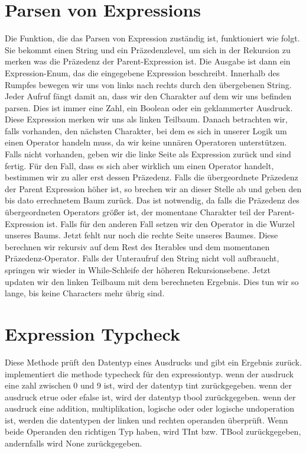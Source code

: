 \documentclass[a4paper, 1ppt]{article}
\begin{document}
\section{Parsen von Expressions}
Die Funktion, die das Parsen von Expression zuständig ist, funktioniert wie folgt.
Sie bekommt einen String und ein Präzedenzlevel, um sich in der Rekursion zu merken
was die Präzedenz der Parent-Expression ist. Die Ausgabe ist dann ein Expression-Enum, das die eingegebene Expression beschreibt.
Innerhalb des Rumpfes bewegen wir uns von links nach rechts durch den übergebenen String.
Jeder Aufruf fängt damit an, dass wir den Charakter auf dem wir uns befinden parsen.
Dies ist immer eine Zahl, ein Boolean oder ein geklammerter Ausdruck. 
Diese Expression merken wir uns als linken Teilbaum.
Danach betrachten wir, falls vorhanden, den nächsten Charakter, bei dem es sich in unserer Logik um einen Operator handeln muss, 
da wir keine unnären Operatoren unterstützen. Falls nicht vorhanden, geben wir die linke Seite als Expression zurück und sind fertig.
Für den Fall, dass es sich aber wirklich um einen Operator handelt, bestimmen wir zu aller erst dessen Präzedenz.
Falls die übergeordnete Präzedenz der Parent Expression höher ist, so brechen wir an dieser Stelle ab und geben den bis dato errechnetem Baum zurück.
Das ist notwendig, da falls die Präzedenz des übergeordneten Operators größer ist, der momentane Charakter teil der Parent-Expression ist.
Falls für den anderen Fall setzen wir den Operator in die Wurzel unseres Baums. 
Jetzt fehlt nur noch die rechte Seite unseres Baumes.
Diese berechnen wir rekursiv auf dem Rest des Iterables und dem momentanen Präzedenz-Operator.
Falls der Unteraufruf den String nicht voll aufbraucht, springen wir wieder in While-Schleife der höheren Rekursionsebene.
Jetzt updaten wir den linken Teilbaum mit dem berechneten Ergebnis.
Dies tun wir so lange, bis keine Characters mehr übrig sind.
\section{Expression Typcheck}
Diese Methode prüft den Datentyp eines Ausdrucks und gibt ein Ergebnis zurück.
implementiert die methode typecheck für den expressiontyp.
wenn der ausdruck eine zahl zwischen 0 und 9 ist, wird der datentyp tint zurückgegeben.
wenn der ausdruck etrue oder efalse ist, wird der datentyp tbool zurückgegeben.
wenn der ausdruck eine addition, multiplikation, logische oder oder logische undoperation ist, werden die datentypen der linken und rechten operanden überprüft.
Wenn beide Operanden den richtigen Typ haben, wird TInt bzw.
TBool zurückgegeben, andernfalls wird None zurückgegeben.
\end{document}
